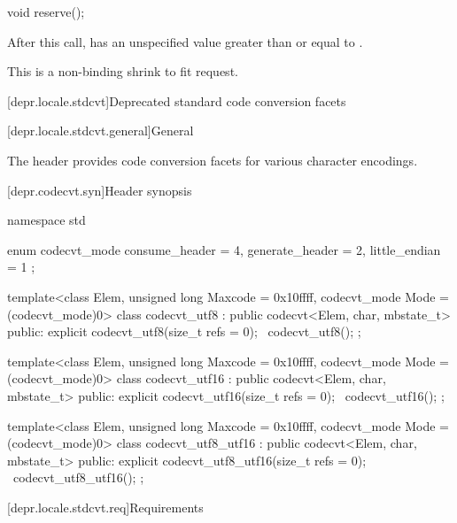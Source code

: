 %
\begin{itemdecl}
void reserve();
\end{itemdecl}

\begin{itemdescr}
\pnum
\effects
After this call,  has an unspecified value
greater than or equal to .
\begin{note}
This is a non-binding shrink to fit request.
\end{note}
\end{itemdescr}

[depr.locale.stdcvt]{Deprecated standard code conversion facets}

[depr.locale.stdcvt.general]{General}

\pnum
The header  provides
code conversion facets for various character encodings.

[depr.codecvt.syn]{Header  synopsis}

%
%
%
%
\begin{codeblock}
namespace std {
  enum codecvt_mode {
    consume_header = 4,
    generate_header = 2,
    little_endian = 1
  };

  template<class Elem, unsigned long Maxcode = 0x10ffff, codecvt_mode Mode = (codecvt_mode)0>
    class codecvt_utf8 : public codecvt<Elem, char, mbstate_t> {
    public:
      explicit codecvt_utf8(size_t refs = 0);
      ~codecvt_utf8();
    };

  template<class Elem, unsigned long Maxcode = 0x10ffff, codecvt_mode Mode = (codecvt_mode)0>
    class codecvt_utf16 : public codecvt<Elem, char, mbstate_t> {
    public:
      explicit codecvt_utf16(size_t refs = 0);
      ~codecvt_utf16();
    };

  template<class Elem, unsigned long Maxcode = 0x10ffff, codecvt_mode Mode = (codecvt_mode)0>
    class codecvt_utf8_utf16 : public codecvt<Elem, char, mbstate_t> {
    public:
      explicit codecvt_utf8_utf16(size_t refs = 0);
      ~codecvt_utf8_utf16();
    };
}
\end{codeblock}

[depr.locale.stdcvt.req]{Requirements}

